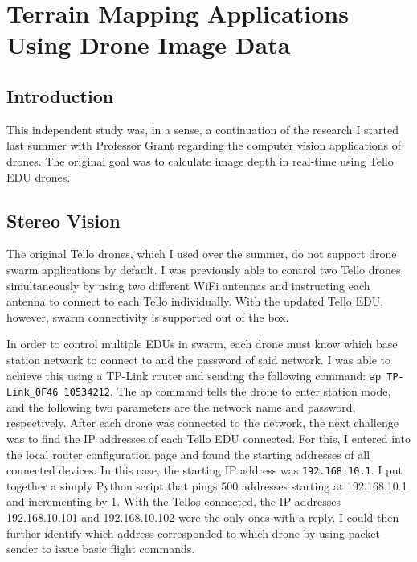 
\part{Terrain Mapping Applications Using Drone Image Data}
\label{terrainmappingapplicationsusingdroneimagedata}

\chapter{Introduction}
\label{introduction}

This independent study was, in a sense, a continuation of the research I started last summer with Professor Grant regarding the computer vision applications of drones. The original goal was to calculate image depth in real-time using Tello EDU drones.

\chapter{Stereo Vision}
\label{stereovision}

The original Tello drones, which I used over the summer, do not support drone swarm applications by default. I was previously able to control two Tello drones simultaneously by using two different WiFi antennas and instructing each antenna to connect to each Tello individually. With the updated Tello EDU, however, swarm connectivity is supported out of the box.

In order to control multiple EDUs in swarm, each drone must know which base station network to connect to and the password of said network. I was able to achieve this using a TP-Link router and sending the following command: \texttt{ap TP-Link\_0F46 10534212}. The ap command tells the drone to enter station mode, and the following two parameters are the network name and password, respectively. After each drone was connected to the network, the next challenge was to find the IP addresses of each Tello EDU connected. For this, I entered into the local router configuration page and found the starting addresses of all connected devices. In this case, the starting IP address was \texttt{192.168.10.1}. I put together a simply Python script that pings 500 addresses starting at 192.168.10.1 and incrementing by 1. With the Tellos connected, the IP addresses 192.168.10.101 and 192.168.10.102 were the only ones with a reply. I could then further identify which address corresponded to which drone by using packet sender to issue basic flight commands. 

